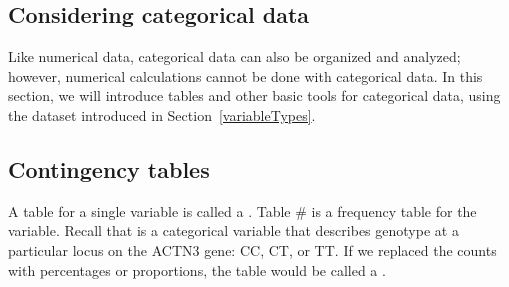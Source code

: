 \begin{doublespace}

\textC{\newpage}


\section[Considering categorical data]{Considering categorical data }
\label{categoricalData}


Like numerical data, categorical data can also be organized and analyzed; however, numerical calculations cannot be done with categorical data. In this section, we will introduce tables and other basic tools for categorical data, using the  dataset introduced in Section~\ref{variableTypes}. 


\subsection{Contingency tables}
A table for a single variable is called a . Table \# is a frequency table for the  variable. Recall that  is a categorical variable that describes genotype at a particular locus on the ACTN3 gene: CC, CT, or TT. If we replaced the counts with percentages or proportions, the table would be called a .


\end{doublespace}
